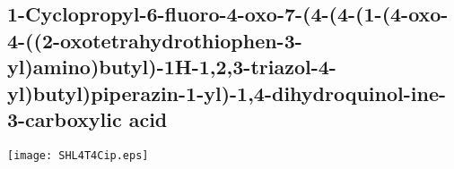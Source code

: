 \subsection{1\hyp{}Cyclopropyl\hyp{}6\hyp{}fluoro\hyp{}4\hyp{}oxo\hyp{}7\hyp{}(4\hyp{}(4\hyp{}(1\hyp{}(4\hyp{}oxo\hyp{}4\hyp{}((2\hyp{}oxotetrahydrothiophen\hyp{}3\hyp{}yl)amino)butyl)\hyp{}1H\hyp{}1,2,3\hyp{}triazol\hyp{}4\hyp{}yl)butyl)piperazin\hyp{}1\hyp{}yl)\hyp{}1,4\hyp{}dihydroquinol\hyp{}ine\hyp{}3\hyp{}carboxylic acid }


\begin{scheme}[H]
	\begin{center}
		\texttt{[image: SHL4T4Cip.eps]}
	\end{center}
\end{scheme}

